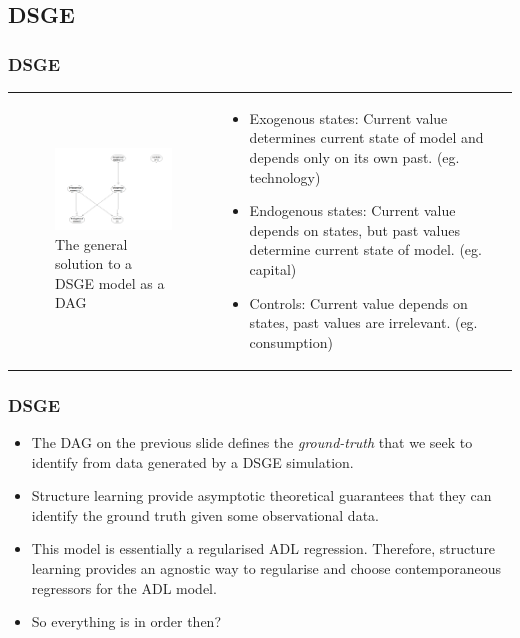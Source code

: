 \documentclass{beamer}
\begin{document}
\subsection{DSGE}
\begin{frame}
    \frametitle{DSGE}
    \begin{tabular}{ p{5cm} p{5cm} }
        \begin{figure}
            \centering
            \includegraphics[width=5cm]{images/dsge_dag.png}
            \caption{The general solution to a DSGE model as a DAG}
            \label{dag3}
          \end{figure}
        &
        \begin{itemize}
            \item Exogenous states: Current value determines current state of model and depends only on its own past. (eg. technology)
            \item Endogenous states: Current value depends on states, but past values determine current state of model. (eg. capital)
            \item Controls: Current value depends on states, past values are irrelevant. (eg. consumption)
        \end{itemize}
    \end{tabular}
\end{frame}

\begin{frame}
    \frametitle{DSGE}
    \begin{itemize}
        \item The DAG on the previous slide defines the \textit{ground-truth} that we seek to identify from data generated by a DSGE simulation.
        \item Structure learning provide asymptotic theoretical guarantees that they can identify the ground truth given some observational data.
        \item This model is essentially a regularised ADL regression. Therefore, structure learning provides an agnostic way to regularise and choose contemporaneous regressors for the ADL model. 
        \item So everything is in order then?
    \end{itemize}
\end{frame}
\end{document}
